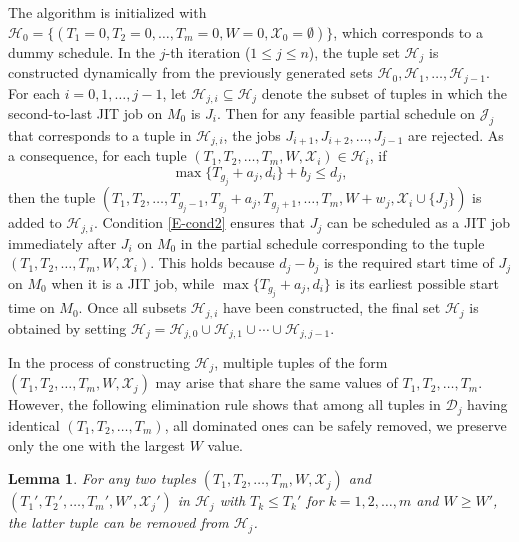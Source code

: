 \documentclass[12pt, eqno, limlimits]{article}
\newtheorem{lemma}{Lemma}[section]
\begin{document}
\begin{sloppypar}
        The algorithm is initialized with $\mathcal{H}_0=\{(T_1=0, T_2=0, \ldots, T_m=0, W=0, \mathcal{X}_0=\emptyset)\}$, which corresponds to a dummy schedule. In the $j$-th iteration ($1 \leq j \leq n$), the tuple set $\mathcal{H}_j$ is constructed dynamically from the previously generated sets $\mathcal{H}_0, \mathcal{H}_{1}, \ldots, \mathcal{H}_{j-1}$. For each $i=0, 1, \ldots, j-1$, let $\mathcal{H}_{j,i} \subseteq \mathcal{H}_j$ denote the subset of tuples in which the second-to-last JIT job on $M_0$ is $J_i$. Then for any feasible partial schedule on $\mathcal{J}_j$ that corresponds to a tuple in $\mathcal{H}_{j,i}$, the jobs $J_{i+1}, J_{i+2}, \ldots, J_{j-1}$ are rejected. As a consequence, for each tuple $(T_1, T_2, \ldots, T_m, W, \mathcal{X}_i) \in \mathcal{H}_i$, if 
        \begin{equation} \label{E-cond2}
            \max\{T_{g_j}+a_j, d_i\}+b_j \leq d_j,
        \end{equation} 
        then the tuple $(T_1, T_2, \ldots, T_{g_j-1}, T_{g_j}+a_j, T_{g_j+1}, \ldots, T_m, W+w_j, \mathcal{X}_i \cup \{J_j\})$ is added to $\mathcal{H}_{j,i}$. Condition \eqref{E-cond2} ensures that $J_j$ can be scheduled as a JIT job immediately after $J_i$ on $M_0$ in the partial schedule corresponding to the tuple $(T_1, T_2, \ldots, T_m, W, \mathcal{X}_i)$. This holds because $d_j-b_j$ is the required start time of $J_j$ on $M_0$ when it is a JIT job, while $\max\{T_{g_j}+a_j, d_i\}$ is its earliest possible start time on $M_0$. Once all subsets $\mathcal{H}_{j,i}$ have been constructed, the final set $\mathcal{H}_j$ is obtained by setting $\mathcal{H}_{j}=\mathcal{H}_{j,0} \cup \mathcal{H}_{j,1} \cup \cdots \cup \mathcal{H}_{j,j-1}$.
        
        In the process of constructing $\mathcal{H}_j$, multiple tuples of the form $(T_1, T_2, \ldots, T_m, W, \mathcal{X}_j)$ may arise that share the same values of $T_1, T_2, \ldots, T_m$. However, the following elimination rule shows that among all tuples in $\mathcal{D}_j$ having identical $(T_1, T_2, \ldots, T_m)$, all dominated ones can be safely removed, we preserve only the one with the largest $W$ value.
        
        
        \begin{lemma} \label{L-4.3}
            For any two tuples $(T_1, T_2, \ldots, T_m, W, \mathcal{X}_j)$ and $(T_1', T_2', \ldots, T_m', W', \mathcal{X}_j')$ in $\mathcal{H}_j$ with $T_k \leq T_k'$ for $k=1, 2, \ldots, m$ and $W \geq W'$, the latter tuple can be removed from $\mathcal{H}_j$.
        \end{lemma}
        

\end{sloppypar}
\end{document}
